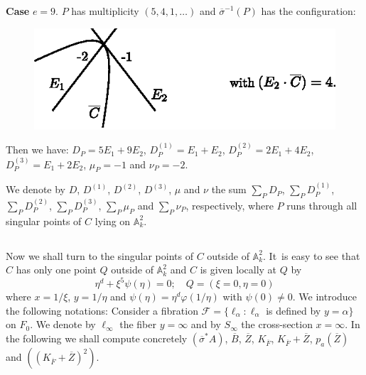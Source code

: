 \medskip
\noindent
{\bf Case} $e=9$. $P$ has multiplicity $(5,4,1,\ldots)$ and
$\overline{\sigma}^{-1}(P)$ has the configuration:
\begin{figure}[H]
\centering
\includegraphics{figures/miyansi_fig35.eps}
\end{figure}
Then we have: $D_{P}=5E_{1}+9E_{2}$, $D^{(1)}_{P}=E_{1}+E_{2}$,
$D^{(2)}_{P}=2E_{1}+4E_{2}$, $D^{(3)}_{P}=E_{1}+2E_{2}$, $\mu_{P}=-1$
and $\nu_{P}=-2$.

We denote by $D$, $D^{(1)}$, $D^{(2)}$, $D^{(3)}$, $\mu$ and $\nu$ the
sum ${\displaystyle{\mathop{\sum}_{P}}}D_{P}$,
${\displaystyle{\mathop{\sum}_{P}}}D^{(1)}_{P}$,
${\displaystyle{\mathop{\sum}_{P}}}D^{(2)}_{P}$,
${\displaystyle{\mathop{\sum}_{P}}}D^{(3)}_{P}$,
${\displaystyle{\mathop{\sum}_{P}}}\mu_{P}$ and
${\displaystyle{\mathop{\sum}_{P}}}\nu_{P}$, respectively, where $P$
runs through all singular points of $C$ lying on $\mathbb{A}^{2}_{k}$.

\subsection{}\label{chap3:3.5}
Now we shall turn to the singular points of $C$ outside of
$\mathbb{A}^{2}_{k}$. It\pageoriginale\ is easy to see that $C$ has
only one point $Q$ outside of $\mathbb{A}^{2}_{k}$ and $C$ is given
locally at $Q$ by
$$
\eta^{d}+\xi^{5}\psi(\eta)=0;\quad Q=(\xi=0,\eta=0)
$$
where $x=1/\xi$, $y=1/\eta$ and $\psi(\eta)=\eta^{d}\varphi(1/\eta)$
with $\psi(0)\neq 0$. We introduce the following notations: Consider a
fibration $\mathscr{F}=\{\ell_{\alpha}:\ell_{\alpha}$ is defined by
$y=\alpha\}$ on $F_{0}$. We denote by $\ell_{\infty}$ the fiber
$y=\infty$ and by $S_{\infty}$ the cross-section $x=\infty$. In the
following we shall compute concretely $(\overline{\sigma}^{\ast}A)$,
$\overline{B}$, $\overline{Z}$, $K_{\overline{F}}$,
$K_{\overline{F}}+\overline{Z}$, $p_{a}(\overline{Z})$ and
$((K_{\overline{F}}+\overline{Z})^{2})$. 

